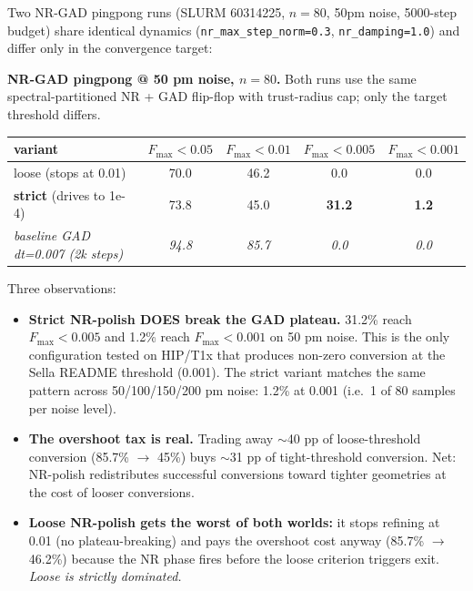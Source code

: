 \documentclass[11pt]{article}
\begin{document}
Two NR-GAD pingpong runs (SLURM 60314225, $n=80$, 50pm noise, 5000-step
budget) share identical dynamics (\texttt{nr\_max\_step\_norm=0.3},
\texttt{nr\_damping=1.0}) and differ only in the convergence target:

\begin{center}\small
\textbf{NR-GAD pingpong @ 50 pm noise, $n=80$.} Both runs use the same
spectral-partitioned NR + GAD flip-flop with trust-radius cap; only the
target threshold differs.\\[0.3em]
\begin{tabular}{l|cccc}
\toprule
\textbf{variant} & \textbf{$F_\mathrm{max}<0.05$} & \textbf{$F_\mathrm{max}<0.01$}
& \textbf{$F_\mathrm{max}<0.005$} & \textbf{$F_\mathrm{max}<0.001$} \\
\midrule
loose (stops at 0.01)            & 70.0 & 46.2 & 0.0  & 0.0 \\
\textbf{strict} (drives to 1e-4) & 73.8 & 45.0 & \textbf{31.2} & \textbf{1.2} \\
\midrule
\textit{baseline GAD dt=0.007 (2k steps)} & \textit{94.8} & \textit{85.7} & \textit{0.0} & \textit{0.0} \\
\bottomrule
\end{tabular}
\end{center}

Three observations:

\begin{itemize}[leftmargin=1.5em, itemsep=0.05em]
\item \textbf{Strict NR-polish DOES break the GAD plateau.}
  31.2\% reach $F_\mathrm{max}<0.005$ and 1.2\% reach $F_\mathrm{max}<0.001$
  on 50 pm noise. This is the only configuration tested on HIP/T1x that
  produces non-zero conversion at the Sella README threshold (0.001).
  The strict variant matches the same pattern across 50/100/150/200 pm
  noise: 1.2\% at 0.001 (i.e.\ 1 of 80 samples per noise level).
\item \textbf{The overshoot tax is real.} Trading away $\sim$40 pp of
  loose-threshold conversion (85.7\% $\to$ 45\%) buys $\sim$31 pp of
  tight-threshold conversion. Net: NR-polish redistributes successful
  conversions toward tighter geometries at the cost of looser conversions.
\item \textbf{Loose NR-polish gets the worst of both worlds:} it stops
  refining at 0.01 (no plateau-breaking) and pays the overshoot cost
  anyway (85.7\% $\to$ 46.2\%) because the NR phase fires before the
  loose criterion triggers exit. \emph{Loose is strictly dominated.}
\end{itemize}
\end{document}
